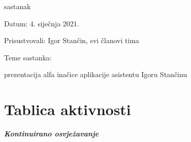 \begin{packed_enum}
			\item  sastanak
			\item[] \begin{packed_item}
				\item Datum: 4. siječnja 2021. 
				\item Prisustvovali: Igor Stančin, svi članovi tima
				\item Teme sastanka:
				\begin{packed_item}
					\item prezentacija alfa inačice aplikacije asistentu Igoru Stančinu
				\end{packed_item}
			\end{packed_item}
		\end{packed_enum}
		
		\eject
		\section*{Tablica aktivnosti}
		
			\textbf{\textit{Kontinuirano osvježavanje}}\\
			
					
						
